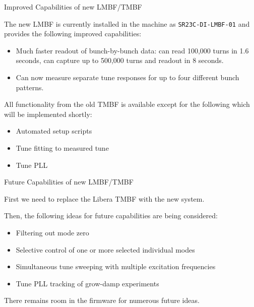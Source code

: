 \documentclass{beamer}
\begin{document}
%
\begin{frame}{Improved Capabilities of new LMBF/TMBF}

The new LMBF is currently installed in the machine as \texttt{SR23C-DI-LMBF-01}
and provides the following improved capabilities:
\begin{itemize}
\item
    Much faster readout of bunch-by-bunch data: can read 100,000 turns in 1.6
    seconds, can capture up to 500,000 turns and readout in 8 seconds.
\item
    Can now measure separate tune responses for up to four different bunch
    patterns.
\end{itemize}

All functionality from the old TMBF is available except for the following which
will be implemented shortly:
\begin{itemize}
\item
    Automated setup scripts
\item
    Tune fitting to measured tune
\item
    Tune PLL
\end{itemize}

\end{frame}

%
\begin{frame}{Future Capabilities of new LMBF/TMBF}

First we need to replace the Libera TMBF with the new system.

\bigskip

Then, the following ideas for future capabilities are being considered:

\begin{itemize}
\item
    Filtering out mode zero
\item
    Selective control of one or more selected individual modes
\item
    Simultaneous tune sweeping with multiple excitation frequencies
\item
    Tune PLL tracking of grow-damp experiments
\end{itemize}

There remains room in the firmware for numerous future ideas.

\end{frame}
\end{document}
